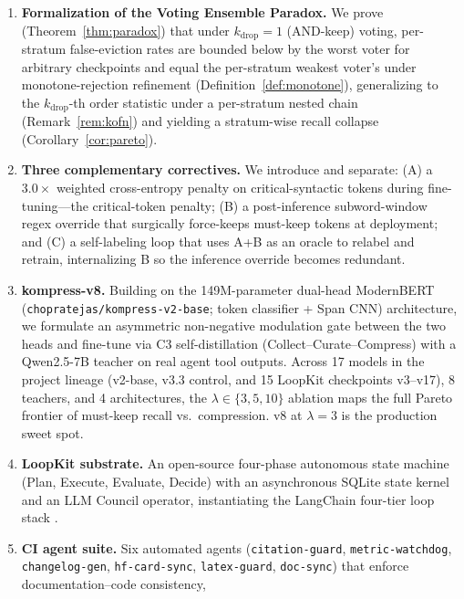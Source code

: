 \begin{enumerate}
  \item \textbf{Formalization of the Voting Ensemble Paradox.} We prove
        (Theorem~\ref{thm:paradox}) that under $k_{\mathrm{drop}}{=}1$
        (AND-keep) voting, per-stratum false-eviction rates are bounded below
        by the worst voter for arbitrary checkpoints and equal the per-stratum
        weakest voter's under monotone-rejection refinement
        (Definition~\ref{def:monotone}), generalizing to the $k_{\mathrm{drop}}$-th
        order statistic under a per-stratum nested chain (Remark~\ref{rem:kofn})
        and yielding a stratum-wise recall collapse (Corollary~\ref{cor:pareto}).
  \item \textbf{Three complementary correctives.} We introduce and
        separate: (A) a $3.0\times$ weighted cross-entropy penalty on
        critical-syntactic tokens during fine-tuning---the critical-token
        penalty; (B) a post-inference subword-window regex override that
        surgically force-keeps must-keep tokens at deployment; and (C) a
        self-labeling loop that uses A+B as an oracle to relabel and retrain,
        internalizing B so the inference override becomes redundant.
  \item \textbf{kompress-v8.} Building on the 149M-parameter dual-head
        ModernBERT (\texttt{chopratejas/kompress-v2-base}; token classifier +
        Span CNN) architecture, we formulate an asymmetric non-negative
        modulation gate between the two heads and fine-tune via C3
        self-distillation (Collect--Curate--Compress) with a Qwen2.5-7B
        teacher on real agent tool outputs. Across 17 models in the project
        lineage (v2-base, v3.3 control, and 15 LoopKit checkpoints v3--v17),
        8 teachers, and 4 architectures, the $\lambda\in\{3,5,10\}$ ablation
        maps the full Pareto frontier of must-keep recall vs.\ compression. v8
        at $\lambda{=}3$ is the production sweet spot.
  \item \textbf{LoopKit substrate.} An open-source four-phase autonomous
        state machine (Plan, Execute, Evaluate, Decide) with an asynchronous
        SQLite state kernel and an LLM Council operator, instantiating the
        LangChain four-tier loop stack \citep{lodri2026loopkit}.
  \item \textbf{CI agent suite.} Six automated agents
        (\texttt{citation-guard}, \texttt{metric-watchdog},
        \texttt{changelog-gen}, \texttt{hf-card-sync}, \texttt{latex-guard},
        \texttt{doc-sync}) that enforce documentation--code consistency,

\end{enumerate}
